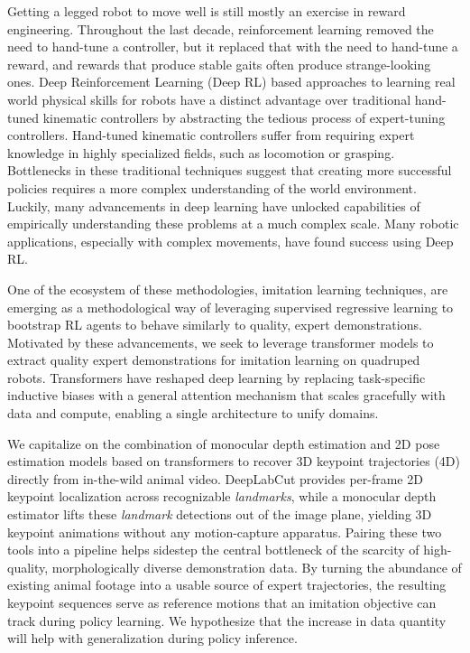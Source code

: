 \documentclass{article}
\theoremstyle{plain}
\theoremstyle{definition}
\theoremstyle{remark}
\begin{document}
Getting a legged robot to move well is still mostly an exercise in reward engineering. Throughout the last decade, reinforcement learning removed the need to hand-tune a controller, but it replaced that with the need to hand-tune a reward, and rewards that produce stable gaits often produce strange-looking ones. Deep Reinforcement Learning (Deep RL) based approaches to learning real world physical skills for robots have a distinct advantage over traditional hand-tuned kinematic controllers by abstracting the tedious process of expert-tuning controllers. Hand-tuned kinematic controllers suffer from requiring expert knowledge in highly specialized fields, such as locomotion or grasping. Bottlenecks in these traditional techniques suggest that creating more successful policies requires a more complex understanding of the world environment. Luckily, many advancements in deep learning have unlocked capabilities of empirically understanding these problems at a much complex scale. Many robotic applications, especially with complex movements, have found success using Deep RL.

One of the ecosystem of these methodologies, imitation learning techniques, are emerging as a methodological way of leveraging supervised regressive learning to bootstrap RL agents to behave similarly to quality, expert demonstrations. Motivated by these advancements, we seek to leverage transformer models to extract quality expert demonstrations for imitation learning on quadruped robots. Transformers have reshaped deep learning by replacing task-specific inductive biases with a general attention mechanism that scales gracefully with data and compute, enabling a single architecture to unify domains.

We capitalize on the combination of monocular depth estimation and 2D pose estimation models based on transformers to recover 3D keypoint trajectories (4D) directly from in-the-wild animal video. DeepLabCut provides per-frame 2D keypoint localization across recognizable \textit{landmarks}, while a monocular depth estimator lifts these \textit{landmark }detections out of the image plane, yielding 3D keypoint animations without any motion-capture apparatus. Pairing these two tools into a pipeline helps sidestep the central bottleneck of the scarcity of high-quality, morphologically diverse demonstration data. By turning the abundance of existing animal footage into a usable source of expert trajectories, the resulting keypoint sequences serve as reference motions that an imitation objective can track during policy learning. We hypothesize that the increase in data quantity will help with generalization during policy inference.
\end{document}
